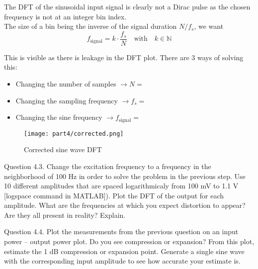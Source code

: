 The DFT of the sinusoidal input signal is clearly not a Dirac pulse as the chosen frequency is not at an integer bin index. \\

The size of a bin being the inverse of the signal duration $N/f_s$, we want
\begin{equation*}
    f_{\text{signal}} = k \cdot \frac{f_s}{N} \quad \text{with} \quad k \in \mathbb{N}
\end{equation*}

This is visible as there is leakage in the DFT plot. There are 3 ways of solving this:
\begin{itemize}
    \item Changing the number of samples $\rightarrow N = $
    \item Changing the sampling frequency $\rightarrow f_s = $
    \item Changing the sine frequency $\rightarrow f_{\text{signal}} = $
\end{itemize}

\begin{figure}[H]
    \centering
    \texttt{[image: part4/corrected.png]}
    \caption{Corrected sine wave DFT}
    \label{fig:corrected}
\end{figure}


\begin{Task}{Question 4.3.}
    Change the excitation frequency to a frequency in the neighborhood of 100 Hz in order to solve the problem in the previous step. Use 10 different amplitudes that are spaced logarithmicaly from 100 mV to 1.1 V [logspace command in MATLAB]). Plot the DFT of the output for each amplitude. What are the frequencies at which you expect distortion to appear? Are they all present in reality? Explain.
\end{Task}

\begin{Task}{Question 4.4.}
    Plot the measurements from the previous question on an input power – output power plot. Do you see compression or expansion? From this plot, estimate the 1 dB compression or expansion point. Generate a single sine wave with the corresponding input amplitude to see how accurate your estimate is.
\end{Task}

